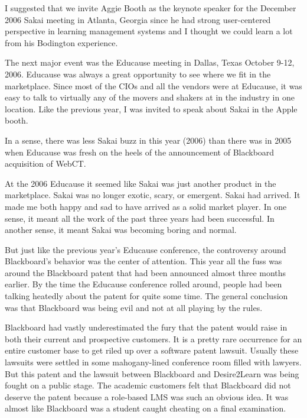 \documentclass[12pt]{book}
\begin{document}
I suggested that we invite Aggie Booth as the keynote speaker for the
December 2006 Sakai meeting in Atlanta, Georgia since he had  strong
user-centered perspective in learning management systems and I thought we
could learn a lot from his Bodington experience.


The next major event was the Educause meeting in Dallas, Texas
October 9-12, 2006.  Educause was always a great opportunity to
see where we fit in the marketplace.  Since most of the CIOs and all
the vendors were at Educause, it was easy to talk to virtually any
of the movers and shakers at in the industry in one location.
Like the previous year, I was invited to speak about Sakai in the
Apple booth.

In a sense, there was less Sakai buzz
in this year (2006) than there was in 2005 when Educause was
fresh on the heels of the announcement of Blackboard acquisition
of WebCT.

At the 2006 Educause it seemed like Sakai was just another product
in the marketplace.  Sakai was no longer exotic, scary, or emergent.
Sakai had arrived.  It made me both happy and sad to have arrived
as a solid market player.   In one sense, it meant all the work
of the past three years had been successful.  In another sense,
it meant Sakai was becoming boring and normal.

But just like the previous year's Educause conference, the controversy around
Blackboard's behavior was the center of attention.  This year
all the fuss was around the Blackboard patent that had been announced
almost three months earlier.  By the time the Educause conference
rolled around, people had been talking heatedly about the patent
for quite some time.   The general conclusion was that Blackboard
was being evil and not at all playing by the rules.

Blackboard had vastly underestimated the fury that the patent
would raise in both their current and prospective customers.
It is a pretty rare occurrence for an entire customer base to get
riled up over a software patent lawsuit.  Usually these lawsuits
were settled in some mahogany-lined conference room filled with
lawyers.   But this patent and the lawsuit between Blackboard
and Desire2Learn was being fought on a public stage.
The academic customers felt that Blackboard did not deserve
the patent because a role-based LMS was such an obvious idea.
It was almost like Blackboard was a student caught cheating on a
final examination.
\end{document}
